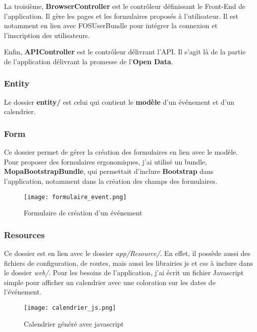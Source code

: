 La troisième, \textbf{BrowserController} est le contrôleur définissant le Front-End de l'application. Il gère les pages et les formulaires proposés à l'utilisateur. Il est notamment en lien avec FOSUserBundle pour intégrer la connexion et l'inscription des utilisateurs.

Enfin, \textbf{APIController} est le contrôleur délivrant l'API. Il s'agit là de la partie de l'application délivrant la promesse de l'\textbf{Open Data}.

\subsubsection*{Entity}

Le dossier \textbf{entity/} est celui qui contient le \textbf{modèle} d'un événement et d'un calendrier.

\subsubsection*{Form}

Ce dossier permet de gérer la création des formulaires en lien avec le modèle. Pour proposer des formulaires ergonomiques, j'ai utilisé un bundle, \textbf{MopaBootstrapBundle}, qui permettait d'inclure \textbf{Bootstrap} dans l'application, notamment dans la création des champs des formulaires.

\begin{figure}[H]
\begin{center}
\texttt{[image: formulaire\_event.png]}
\end{center}
\caption{Formulaire de création d'un événement}
\end{figure}

\subsubsection*{Resources}

Ce dossier est en lien avec le dossier \textit{app/Resource/}. En effet, il possède aussi des fichiers de configuration, de routes, mais aussi les librairies js et css à inclure dans le dossier \textit{web/}. Pour les besoins de l'application, j'ai écrit un fichier Javascript simple pour afficher un calendrier avec une coloration sur les dates de l'événement.

\begin{figure}[H]
\begin{center}
\texttt{[image: calendrier\_js.png]}
\end{center}
\caption{Calendrier généré avec javascript}
\end{figure}

